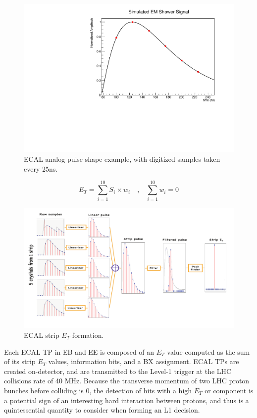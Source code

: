 \begin{figure}[H]
    \centering
    \includegraphics[scale=0.5]{Images/ECAL/TPG/EM_Waveform_Example.pdf}
    \caption{ECAL analog pulse shape example, with digitized samples taken every 25ns.}
    \label{fig:ECAL_Waveform_Digis}
\end{figure}

\begin{equation} \label{eq:weights_equations}
E_{T} = \sum_{i=1}^{10}S_{i}\times w_{i}
   \quad\text{,}\quad 
\sum_{i=1}^{10}w_{i} = 0 
\end{equation}

\begin{figure}[H]
    \centering
    \includegraphics[width=\textwidth]{Images/ECAL/TPG/XTAL_To_ET.png} \caption{ECAL strip $E_{T}$ formation.}
    \label{fig:ECAL_TP_Formation}
\end{figure}

Each ECAL TP in EB and EE is composed of an $E_{T}$ value computed as the sum of its strip $E_{T}$ values, information bits, and a BX assignment. ECAL TPs are created on-detector, and are transmitted to the Level-1 trigger at the LHC collisions rate of 40 MHz. Because the transverse momentum of two LHC proton bunches before colliding is 0, the detection of hits with a high $E_{T}$ or \pt component is a potential sign of an interesting hard interaction between protons, and thus is a quintessential quantity to consider when forming an L1 decision.  

